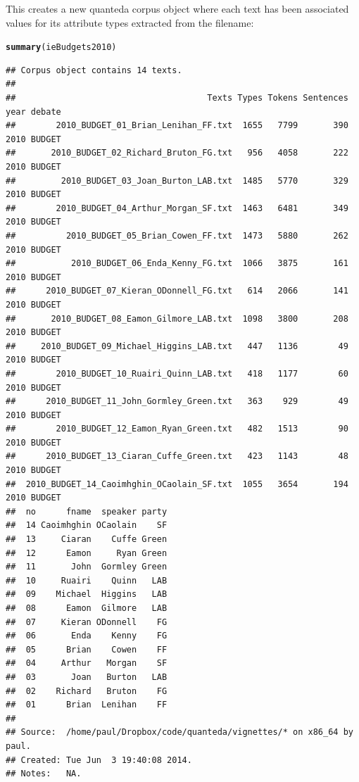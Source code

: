\documentclass[11pt]{article}\usepackage[]{graphicx}\usepackage[]{color}
\makeatletter
\newcommand{\hlstd}[1]{\textcolor[rgb]{0.345,0.345,0.345}{#1}}%
\newcommand{\hlkwd}[1]{\textcolor[rgb]{0.737,0.353,0.396}{\textbf{#1}}}%
\newenvironment{kframe}{%
 \def\at@end@of@kframe{}%
 \ifinner\ifhmode%
  \def\at@end@of@kframe{\end{minipage}}%
  \begin{minipage}{\columnwidth}%
 \fi\fi%
 \def\FrameCommand##1{\hskip\@totalleftmargin \hskip-\fboxsep
 \colorbox{shadecolor}{##1}\hskip-\fboxsep
     \hskip-\linewidth \hskip-\@totalleftmargin \hskip\columnwidth}%
 \MakeFramed {\advance\hsize-\width
   \@totalleftmargin\z@ \linewidth\hsize
   \@setminipage}}%
 {\par\unskip\endMakeFramed%
 \at@end@of@kframe}
\newenvironment{knitrout}{}{} %
\makeatother
\begin{document}
This creates a new quanteda corpus object where each text has been associated values for its attribute types extracted from the filename:

\begin{knitrout}
\color{fgcolor}\begin{kframe}
\begin{alltt}
\hlkwd{summary}\hlstd{(ieBudgets2010)}
\end{alltt}
\begin{verbatim}
## Corpus object contains 14 texts.
## 
##                                      Texts Types Tokens Sentences year debate
##        2010_BUDGET_01_Brian_Lenihan_FF.txt  1655   7799       390 2010 BUDGET
##       2010_BUDGET_02_Richard_Bruton_FG.txt   956   4058       222 2010 BUDGET
##         2010_BUDGET_03_Joan_Burton_LAB.txt  1485   5770       329 2010 BUDGET
##        2010_BUDGET_04_Arthur_Morgan_SF.txt  1463   6481       349 2010 BUDGET
##          2010_BUDGET_05_Brian_Cowen_FF.txt  1473   5880       262 2010 BUDGET
##           2010_BUDGET_06_Enda_Kenny_FG.txt  1066   3875       161 2010 BUDGET
##      2010_BUDGET_07_Kieran_ODonnell_FG.txt   614   2066       141 2010 BUDGET
##       2010_BUDGET_08_Eamon_Gilmore_LAB.txt  1098   3800       208 2010 BUDGET
##     2010_BUDGET_09_Michael_Higgins_LAB.txt   447   1136        49 2010 BUDGET
##        2010_BUDGET_10_Ruairi_Quinn_LAB.txt   418   1177        60 2010 BUDGET
##      2010_BUDGET_11_John_Gormley_Green.txt   363    929        49 2010 BUDGET
##        2010_BUDGET_12_Eamon_Ryan_Green.txt   482   1513        90 2010 BUDGET
##      2010_BUDGET_13_Ciaran_Cuffe_Green.txt   423   1143        48 2010 BUDGET
##  2010_BUDGET_14_Caoimhghin_OCaolain_SF.txt  1055   3654       194 2010 BUDGET
##  no      fname  speaker party
##  14 Caoimhghin OCaolain    SF
##  13     Ciaran    Cuffe Green
##  12      Eamon     Ryan Green
##  11       John  Gormley Green
##  10     Ruairi    Quinn   LAB
##  09    Michael  Higgins   LAB
##  08      Eamon  Gilmore   LAB
##  07     Kieran ODonnell    FG
##  06       Enda    Kenny    FG
##  05      Brian    Cowen    FF
##  04     Arthur   Morgan    SF
##  03       Joan   Burton   LAB
##  02    Richard   Bruton    FG
##  01      Brian  Lenihan    FF
## 
## Source:  /home/paul/Dropbox/code/quanteda/vignettes/* on x86_64 by paul.
## Created: Tue Jun  3 19:40:08 2014.
## Notes:   NA.
\end{verbatim}
\end{kframe}
\end{knitrout}
\end{document}
